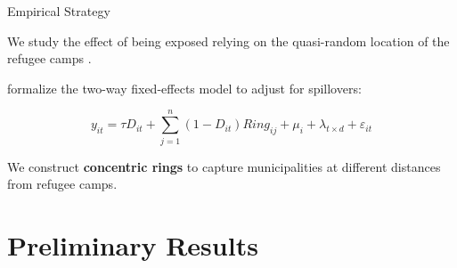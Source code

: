 \documentclass[10pt]{beamer}
\begin{document}
\begin{frame}[label=Strategy]{Empirical Strategy}

We study the effect of being exposed relying on the quasi-random location of the refugee camps \hyperlink{Balance}{}.

\citet{butts_difference--differences_2023} formalize the two-way fixed-effects model to adjust for spillovers: 




\[
y_{it} = \tau D_{it}
+ \sum_{j=1}^{n} (1 - D_{it}) Ring_{ij}
+ \mu_i + \lambda_{t \times d} + \varepsilon_{it}
\]



We construct \textbf{concentric rings} to capture municipalities at different distances from refugee camps. \hyperlink{Buffers}{} \hyperlink{Histogram}{} 

\end{frame}

\section{Preliminary Results}
\end{document}
